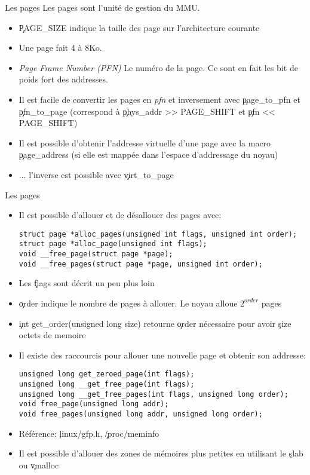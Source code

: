 \begin{frame}[fragile=singleslide]{Les pages}
  Les pages sont l'unité de gestion du MMU. 
  \begin{itemize} 
  \item \c{PAGE_SIZE}  indique la  taille des page  sur l'architecture
    courante
  \item Une page fait 4 à 8Ko.
  \item \emph{Page Frame  Number (PFN)} Le numéro de  la page. Ce sont
    en fait les bit de poids fort des addresses.
  \item  Il  est  facile  de  convertir les  pages  en  \emph{pfn}  et
    inversement avec \c{page_to_pfn}  et \c{pfn_to_page} (correspond à
    \c{phys_addr >> PAGE_SHIFT} et \c{pfn << PAGE_SHIFT})
  \item Il est possible d'obtenir l'addresse virtuelle d'une page avec
    la  macro  \c{page_address}  (si  elle est  mappée  dans  l'espace
    d'addressage du noyau)
  \item ... l'inverse est possible avec \c{virt_to_page}
  \end{itemize}
\end{frame}

\begin{frame}[fragile=singleslide]{Les pages}
  \begin{itemize} 
  \item Il est possible d'allouer et de désallouer des pages avec:
    \begin{lstlisting} 
struct page *alloc_pages(unsigned int flags, unsigned int order);
struct page *alloc_page(unsigned int flags);
void __free_page(struct page *page);
void __free_pages(struct page *page, unsigned int order);
    \end{lstlisting} 
  \item Les \c{flags} sont décrit un peu plus loin
  \item  \c{order} indique  le nombre  de  pages à  allouer. Le  noyau
    alloue $2^{order}$ pages
  \item  \c{int  get_order(unsigned  long  size)}  retourne  \c{order}
    nécessaire pour avoir \c{size} octets de memoire
  \item Il  existe des  raccourcis pour allouer  une nouvelle  page et
    obtenir son addresse:
    \begin{lstlisting} 
unsigned long get_zeroed_page(int flags);
unsigned long __get_free_page(int flags);
unsigned long __get_free_pages(int flags, unsigned long order);
void free_page(unsigned long addr);
void free_pages(unsigned long addr, unsigned long order);
    \end{lstlisting} 
  \item Référence: \c{linux/gfp.h}, \c{/proc/meminfo}
  \item Il est  possible d'allouer des zones de  mémoires plus petites
    en utilisant le \c{slab} ou \c{vmalloc}
  \end{itemize} 
\end{frame} 

